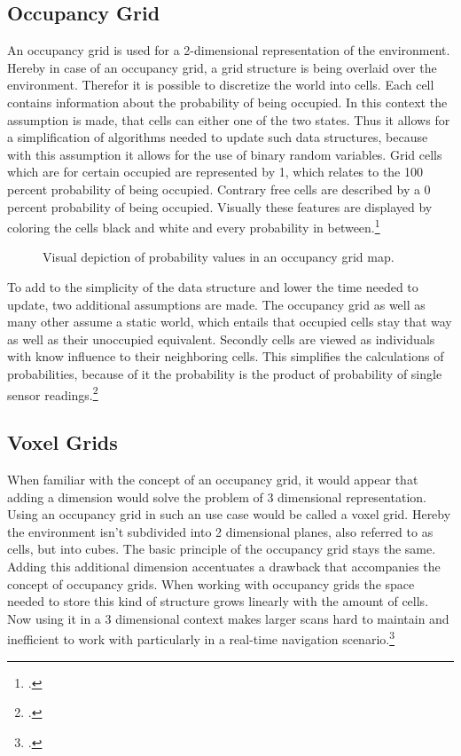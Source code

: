 \subsection{Occupancy Grid}
An occupancy grid is used for a 2-dimensional representation of the environment. Hereby in case of an occupancy grid, a grid structure is being overlaid over the environment. Therefor it is possible to discretize the world into cells. Each cell contains information about the probability of being occupied. In this context the assumption is made, that cells can either one of the two states. Thus it allows for a simplification of algorithms needed to update such data structures, because with this assumption it allows for the use of binary random variables. Grid cells which are for certain occupied are represented by 1, which relates to the 100 percent probability of being occupied. Contrary free cells are described by a 0 percent probability of being occupied. Visually these features are displayed by coloring the cells black and white and every probability in between.\footcite{uni-freiburgOccupancyGridMaps2020}

\begin{figure}[h]
	\centering
	
	\caption{Visual depiction of probability values in an occupancy grid map.}
	\label{fig:abstract_environments_occupancyCells}
\end{figure}

To add to the simplicity of the data structure and lower the time needed to update, two additional assumptions are made. The occupancy grid as well as many other assume a static world, which entails that occupied cells stay that way as well as their unoccupied equivalent. Secondly cells are viewed as individuals with know influence to their neighboring cells. This simplifies the calculations of probabilities, because of it the probability is the product of probability of single sensor readings.\footcite{uni-freiburgOccupancyGridMaps2020}

\subsection{Voxel Grids}

When familiar with the concept of an occupancy grid, it would appear that adding a dimension would solve the problem of 3 dimensional representation.
Using an occupancy grid in such an use case would be called a voxel grid. Hereby the environment isn't subdivided into 2 dimensional planes, also referred to as cells, but into cubes. The basic principle of the occupancy grid stays the same. Adding this additional dimension accentuates a drawback that accompanies the concept of occupancy grids. When working with occupancy grids the space needed to store this kind of structure grows linearly with the amount of cells. Now using it in a 3 dimensional context makes larger scans hard to maintain and inefficient to work with particularly in a real-time navigation scenario.\footcite{uni-freiburgOccupancyGridMaps2020}

